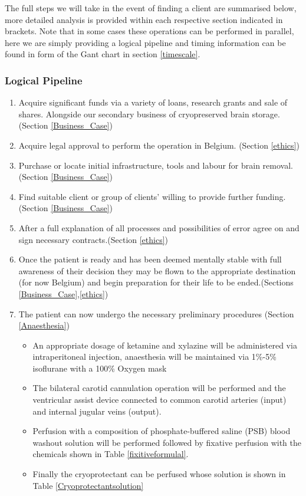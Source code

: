 \documentclass[a4paper, 11pt]{article}
\numberwithin{equation}{section}
\begin{document}
The full steps we will take in the event of finding a client are summarised below, more detailed analysis is provided within each respective section indicated in brackets. Note that in some cases these operations can be performed in parallel, here we are simply providing a logical pipeline and timing information can be found in form of the Gant chart in section \ref{timescale}. 

\subsubsection{Logical Pipeline}

\begin{enumerate}
	\item Acquire significant funds via a variety of loans, research grants and sale of shares. Alongside our secondary business of cryopreserved brain storage. (Section \ref{Business_Case})
	\item Acquire legal approval to perform the operation in Belgium. (Section \ref{ethics})
	\item Purchase or locate initial infrastructure, tools and labour for brain removal. (Section \ref{Business_Case})
	\item Find suitable client or group of clients' willing to provide further funding. (Section \ref{Business_Case})
	\item After a full explanation of all processes and possibilities of error agree on and sign necessary contracts.(Section \ref{ethics})
	\item Once the patient is ready and has been deemed mentally stable with full awareness of their decision they may be flown to the appropriate destination (for now Belgium) and begin preparation for their life to be ended.(Sections \ref{Business_Case},\ref{ethics})
	\item The patient can now undergo the necessary preliminary procedures (Section \ref{Anaesthesia})
	\begin{itemize}
		\item An appropriate dosage of ketamine and xylazine will be administered via intraperitoneal injection, anaesthesia will be maintained via 1\%-5\% isoflurane with a 100\% Oxygen mask 
		\item The bilateral carotid cannulation operation will be performed and the ventricular assist device connected to common carotid arteries (input) and internal jugular veins (output).
		\item Perfusion with a composition of phosphate-buffered saline (PSB) blood washout solution will be performed followed by fixative perfusion with the chemicals shown in Table \ref{fixitiveformulal}.
		\item Finally the cryoprotectant can be perfused whose solution is shown in Table \ref{Cryoprotectantsolution}
	\end{itemize}
	


\end{enumerate}
\end{document}
